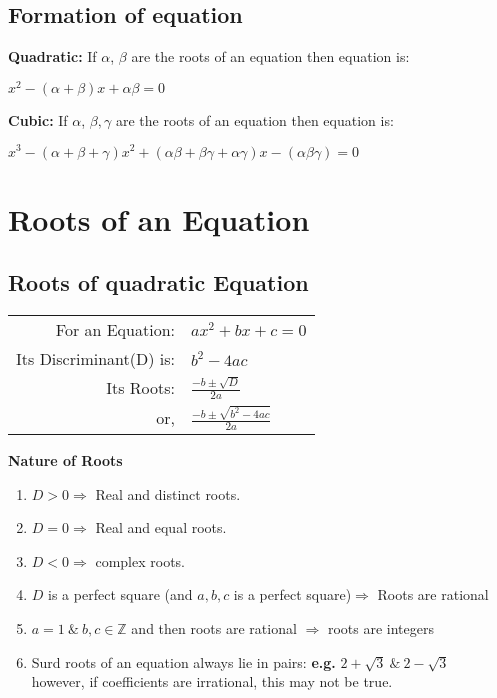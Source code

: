 \documentclass[11pt,a4paper,landscape]{article}
\begin{document}
\begin{multicols*}{3}
	\subsection{Formation of equation}
	\textbf{Quadratic:} If $\alpha$, $\beta$ are the roots of an equation then equation is:\\
	\begin{center}
	$x^2-(\alpha+\beta)x+\alpha\beta=0$
	\end{center}
	\textbf{Cubic:} If $\alpha$, $\beta, \gamma$ are the roots of an equation then equation is:
	\begin{center}
	$x^3-(\alpha+\beta+\gamma)x^2+(\alpha\beta+\beta\gamma+\alpha\gamma)x-(\alpha\beta\gamma)=0$
	\end{center}
\section{Roots of an Equation}
	\subsection{Roots of quadratic Equation}
	\begin{tabular}{rl}
    For an Equation:& $ax^2+bx+c=0$\\
    Its Discriminant(D) is:& $b^2-4ac$\\
    Its Roots:& $\displaystyle{\frac{-b\pm\sqrt{D}}{2a}}$\\
    or,& $\displaystyle{\frac{-b\pm\sqrt{b^2-4ac}}{2a}}$
	\end{tabular}
	\begin{large}
	\textbf{Nature of Roots}
	\end{large}
	
	\renewcommand{\theenumi}{\roman{enumi}}%
	\begin{enumerate}
	\item $D>0\Rightarrow$ Real and distinct roots.
	\item $D=0\Rightarrow$ Real and equal roots.
	\item $D<0\Rightarrow$ complex roots.
	\item $D$ is a perfect square (and $a,b,c$ is a perfect square)$\Rightarrow$ Roots are rational
	\item $a=1\ \&\ b,c\in \mathbb{Z}$ and then roots are rational $\Rightarrow$ roots are integers
	\item Surd roots of an equation always lie in pairs: \textbf{e.g.} $2+\sqrt{3}\ \&\ 2-\sqrt{3}$\\
	however, if coefficients are irrational, this may not be true.
	\end{enumerate}
	

\end{multicols*}
\end{document}
